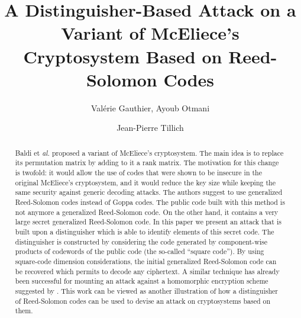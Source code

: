 \documentclass[runningheads,11pt]{llncs}
\begin{document}
\title{ A Distinguisher-Based Attack on a Variant of McEliece's
  Cryptosystem Based on Reed-Solomon Codes
} 

\author{Val\'erie Gauthier, Ayoub Otmani \and Jean-Pierre Tillich}

\maketitle
\begin{center}
  \date{}
\end{center}

\begin{abstract}
Baldi et \textit{al.} proposed a variant of McEliece's cryptosystem. The main idea is to 
replace its permutation matrix by adding to it a rank  matrix. 
The motivation for this change is twofold: it would allow the use of codes that were shown to be insecure 
in the original McEliece's cryptosystem, and it would reduce the key size while keeping 
the same security against generic decoding attacks. The authors suggest to use generalized Reed-Solomon 
codes instead of Goppa codes. The public code built with this method is not anymore a generalized Reed-Solomon code. 
On the other hand, it contains a very large secret generalized Reed-Solomon code. 
In this paper we present an attack that is built upon a distinguisher which is able
to identify elements of this secret code.  
The distinguisher is constructed by considering the code generated by component-wise products of codewords of the public code
(the so-called ``square code''). By using square-code dimension considerations, the initial generalized Reed-Solomon code can be
recovered which permits to decode any ciphertext. A similar technique
has already been successful for mounting an attack \cite{GOT:eprint12} against a homomorphic
encryption scheme suggested by \cite{BL12}. This work can be
viewed as another illustration of how a distinguisher of Reed-Solomon
codes can be used to devise an attack on cryptosystems based on them. 
 \end{abstract}
\end{document}
